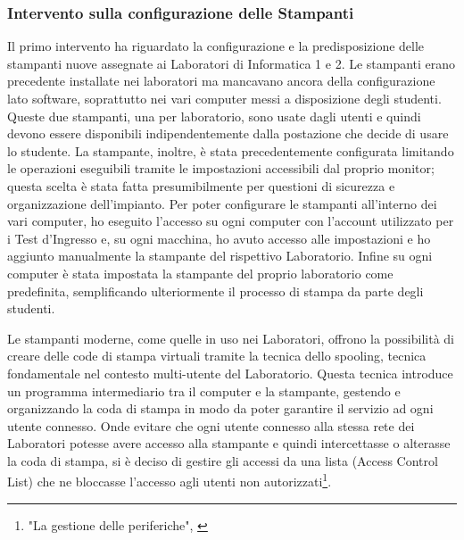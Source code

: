             \subsubsection{Intervento sulla configurazione delle Stampanti}
                    Il primo intervento ha riguardato la configurazione e la predisposizione delle stampanti nuove assegnate ai Laboratori di Informatica 1 e 2. Le stampanti erano precedente installate nei laboratori ma mancavano ancora della configurazione lato software, soprattutto nei vari computer messi a disposizione degli studenti. \newline
                    Queste due stampanti, una per laboratorio, sono usate dagli utenti e quindi devono essere disponibili indipendentemente dalla postazione che decide di usare lo studente. La stampante, inoltre, è stata precedentemente configurata limitando le operazioni eseguibili tramite le impostazioni accessibili dal proprio monitor; questa scelta è stata fatta presumibilmente per questioni di sicurezza e organizzazione dell'impianto. \newline
                    Per poter configurare le stampanti all'interno dei vari computer, ho eseguito l'accesso su ogni computer con l'account utilizzato per i Test d'Ingresso e, su ogni macchina, ho avuto accesso alle impostazioni e ho aggiunto manualmente la stampante del rispettivo Laboratorio. Infine su ogni computer è stata impostata la stampante del proprio laboratorio come predefinita, semplificando ulteriormente il processo di stampa da parte degli studenti.
                \par
                    Le stampanti moderne, come quelle in uso nei Laboratori, offrono la possibilità di creare delle code di stampa virtuali tramite la tecnica dello spooling, tecnica fondamentale nel contesto multi-utente del Laboratorio. Questa tecnica introduce un programma intermediario tra il computer e la stampante, gestendo e organizzando la coda di stampa in modo da poter garantire il servizio ad ogni utente connesso. Onde evitare che ogni utente connesso alla stessa rete dei Laboratori potesse avere accesso alla stampante e quindi intercettasse o alterasse la coda di stampa, si è deciso di gestire gli accessi da una lista (Access Control List) che ne bloccasse l'accesso agli utenti non autorizzati\footnote{"La gestione delle periferiche", \cite{sciutoIntroduzioneAiSistemi2022}}.
    \newpage
